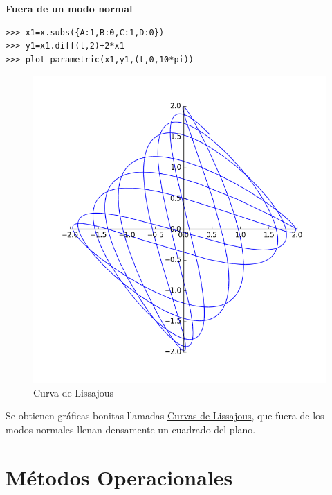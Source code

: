 \noindent\textbf{Fuera de un modo normal}
\begin{lstlisting}
>>> x1=x.subs({A:1,B:0,C:1,D:0})
>>> y1=x1.diff(t,2)+2*x1
>>> plot_parametric(x1,y1,(t,0,10*pi))
\end{lstlisting}

\begin{figure}
  \begin{center}
   \vspace{-.5cm}\includegraphics[scale=.2]{imagenes/lissajous.png}
   \caption{Curva de Lissajous}
 \end{center}
\end{figure}

Se obtienen gráficas  bonitas llamadas \href{http://es.wikipedia.org/wiki/Curva_de_Lissajous}{Curvas de Lissajous}, que fuera de los modos normales llenan densamente un cuadrado del plano.










\section{Métodos Operacionales}


